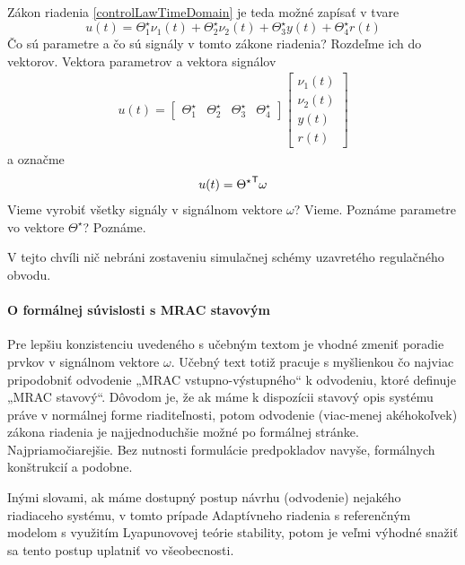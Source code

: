 \documentclass[a4paper, 10pt, ]{article}
\begin{document}
Zákon riadenia \eqref{controlLawTimeDomain} je teda možné zapísať v tvare
\begin{equation} \label{controlLawTimeDomain2}
	u(t) = \Theta_1^\star \nu_1(t)
    + \Theta_2^\star \nu_2(t)
    + \Theta_3^\star y(t) + \Theta_4^\star r(t)
\end{equation}
Čo sú parametre a čo sú signály v tomto zákone riadenia? Rozdeľme ich do vektorov. Vektora parametrov a vektora signálov
\begin{align}
    u(t) =
    \begin{bmatrix}
          \Theta_1^\star & \Theta_2^\star & \Theta_3^\star & \Theta_4^\star
    \end{bmatrix}
    \begin{bmatrix}
          \nu_1(t) \\ \nu_2(t) \\ y(t) \\ r(t)
    \end{bmatrix}
\end{align}
a označme
\begin{align}
    u(t) = {\Theta^\star}^{\mathsf{T}} \omega
\end{align}
Vieme vyrobiť všetky signály v signálnom vektore $\omega$? Vieme. Poznáme parametre vo vektore $\Theta^\star$? Poznáme.

V tejto chvíli nič nebráni zostaveniu simulačnej schémy uzavretého regulačného obvodu.













\paragraph{O formálnej súvislosti s MRAC stavovým}

Pre lepšiu konzistenciu uvedeného s učebným textom je vhodné zmeniť poradie prvkov v signálnom vektore $\omega$. Učebný text totiž pracuje s myšlienkou čo najviac pripodobniť odvodenie „MRAC vstupno-výstupného“ k odvodeniu, ktoré definuje „MRAC stavový“. Dôvodom je, že ak máme k dispozícii stavový opis systému práve v normálnej forme riaditeľnosti, potom odvodenie (viac-menej akéhokoľvek) zákona riadenia je najjednoduchšie možné po formálnej stránke. Najpriamočiarejšie. Bez nutnosti formulácie predpokladov navyše, formálnych konštrukcií a podobne.

Inými slovami, ak máme dostupný postup návrhu (odvodenie) nejakého riadiaceho systému, v tomto prípade Adaptívneho riadenia s referenčným modelom s využitím Lyapunovovej teórie stability, potom je veľmi výhodné snažiť sa tento postup uplatniť vo všeobecnosti.
\end{document}
